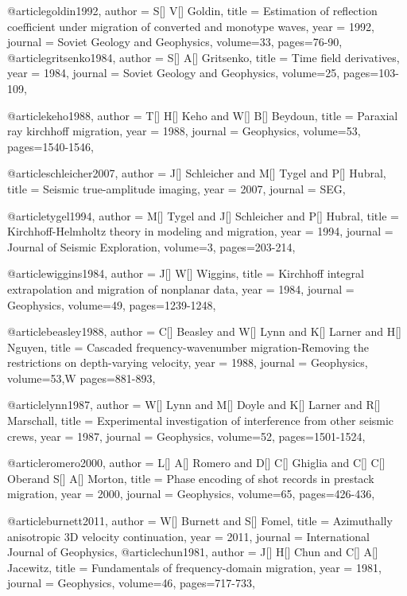@article{goldin1992,
  author =	 {S[] V[] Goldin},
  title =	 {Estimation of reflection coefficient under migration of converted and monotype waves},
  year =	 1992,
  journal =	 {Soviet Geology and Geophysics},
  volume={33},
 pages=76-90,
}
@article{gritsenko1984,
  author =	 {S[] A[] Gritsenko},
  title =	 {Time field derivatives},
  year =	 1984,
  journal =	 {Soviet Geology and Geophysics},
  volume={25},
 pages=103-109,
}

@article{keho1988,
  author =	 {T[] H[] Keho and W[] B[] Beydoun},
  title =	 {Paraxial ray kirchhoff migration},
  year =	 1988,
  journal =	 {Geophysics},
  volume={53},
 pages=1540-1546,
}

@article{schleicher2007,
  author =	 {J[] Schleicher and M[] Tygel and P[] Hubral},
  title =	 {Seismic true-amplitude imaging},
  year =	 2007,
  journal =	 {SEG},
}

@article{tygel1994,
  author =	 {M[] Tygel and J[] Schleicher and P[] Hubral},
  title =	 {Kirchhoff-Helmholtz theory in modeling and migration},
  year =	 1994,
  journal =	 {Journal of Seismic Exploration},
  volume={3},
 pages=203-214,
}

@article{wiggins1984,
  author =	 {J[] W[] Wiggins},
  title =	 {Kirchhoff integral extrapolation and migration of nonplanar data},
  year =	 1984,
  journal =	 {Geophysics},
  volume={49},
 pages=1239-1248,
}

@article{beasley1988,
  author =	 {C[] Beasley and W[] Lynn and K[] Larner and H[] Nguyen},
  title =	 {Cascaded frequency-wavenumber migration-Removing the restrictions on depth-varying velocity},
  year =	 1988,
  journal =	 {Geophysics},
  volume={53},W
 pages=881-893,
}

@article{lynn1987,
  author =	 {W[] Lynn and M[] Doyle and K[] Larner and R[] Marschall},
  title =	 {Experimental investigation of interference from other seismic crews},
  year =	 1987,
  journal =	 {Geophysics},
  volume={52},
 pages=1501-1524,
}

@article{romero2000,
  author =	 {L[] A[] Romero and D[] C[] Ghiglia and C[] C[] Oberand S[] A[] Morton},
  title =	 {Phase encoding of shot records in prestack migration},
  year =	 2000,
  journal =	 {Geophysics},
  volume={65},
 pages=426-436,
}

@article{burnett2011,
  author =	 {W[] Burnett and S[] Fomel},
  title =	 {Azimuthally anisotropic 3{D} velocity continuation},
  year =	 2011,
  journal =	 {International Journal of Geophysics},
}
@article{chun1981,
  author =	 {J[] H[] Chun and C[] A[] Jacewitz},
  title =	 {Fundamentals of frequency-domain migration},
  year =	 1981,
  journal =	 {Geophysics},
  volume={46},
 pages=717-733,
}

